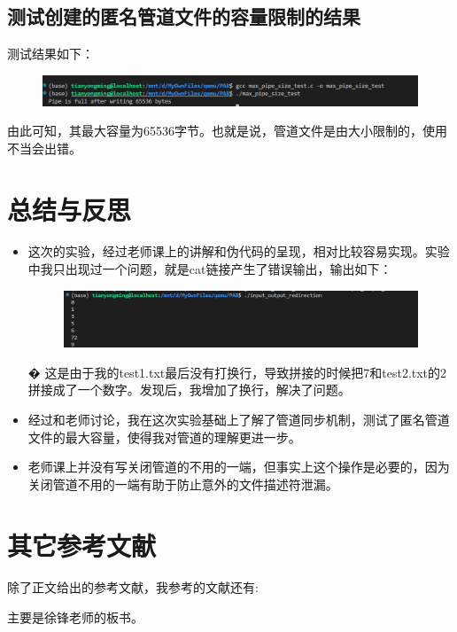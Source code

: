 \documentclass{LabReport}
\begin{document}
	\subsection{测试创建的匿名管道文件的容量限制的结果}
	测试结果如下：
	
\begin{figure}[h!]
	\centering
	\includegraphics[width=1\linewidth]{figures/max_pipe_size}
	\caption{}
	\label{fig:maxpipesize}
\end{figure}

	由此可知，其最大容量为65536字节。也就是说，管道文件是由大小限制的，使用不当会出错。
	
	\section{总结与反思}
	\begin{itemize}
		\item 这次的实验，经过老师课上的讲解和伪代码的呈现，相对比较容易实现。实验中我只出现过一个问题，就是cat链接产生了错误输出，输出如下：
		
\begin{figure}[h!]
	\centering
	\includegraphics[width=1\linewidth]{figures/my_output_false}
	\caption{}
	\label{fig:myoutputfalse}
\end{figure}
�		这是由于我的test1.txt最后没有打换行，导致拼接的时候把7和test2.txt的2拼接成了一个数字。发现后，我增加了换行，解决了问题。
		\item 经过和老师讨论，我在这次实验基础上了解了管道同步机制，测试了匿名管道文件的最大容量，使得我对管道的理解更进一步。
		\item 老师课上并没有写关闭管道的不用的一端，但事实上这个操作是必要的，因为关闭管道不用的一端有助于防止意外的文件描述符泄漏。
	\end{itemize}

	\section{其它参考文献}
	除了正文给出的参考文献，我参考的文献还有:\par\hspace{0em}主要是徐锋老师的板书。
	
\end{document}
